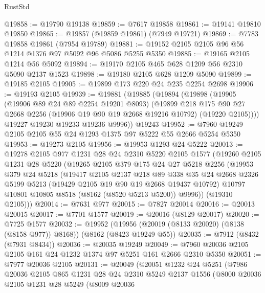 \begin{lexlean}{RustStd}
\begin{coremodule}
@19858 := @19790 @19138
@19859 := @7617 @19858
@19861 := @19141 @19810 @19850
@19865 := @19857 (@19859 @19861) (@7949 @19721)
@19869 := @7783 @19858 @19861 (@7954 @19789)
@19881 := @19152 @2105 @2105 @96 @56 @1214 @1376 @97 @5092 @96 @5086 @5255 @5350
@19885 := @19165 @2105 @1214 @56 @5092
@19894 := @19170 @2105 @465 @628 @1209 @56 @2310 @5090 @2137 @1523
@19898 := @19180 @2105 @628 @1209 @5090
@19899 := @19185 @2105
@19905 := @19899 @173 @220 @24 @235 @2254 @2698
@19906 := @19193 @2105
@19939 := @19881
    (@19885
      (@19894
        (@19898
          (@19905
            (@19906 @89 @24 @89 @2254 @19201 @8093)
            (@19899
              @218
              @175
              @90
              @27
              @2668
              @2256
              (@19906 @19 @90 @19 @2668 @19216 @10792)
              (@19220 @2105))))
        @19227
        @19230
        @19233
        @19236
        @9996))
    @19243
@19952 := @7960 @19249 @2105 @2105 @55 @24 @1293 @1375 @97 @5222 @55 @2666 @5254 @5350
@19953 := @19273 @2105
@19956 := @19953 @1293 @24 @5222
@20013 := @19278
    @2105
    @977
    @1231
    @28
    @24
    @2310
    @5220
    @2105
    @1577
    (@19260
      @2105
      @1231
      @28
      @5220
      (@19265
        @2105
        @379
        @175
        @24
        @27
        @5218
        @2256
        (@19953
          @379
          @24
          @5218
          (@19417
            @2105
            @2137
            @218
            @89
            @338
            @35
            @24
            @2668
            @2326
            @5199
            @5213
            (@19429 @2105 @19 @90 @19 @2668 @19437 @10792)
            @10797
            @10801
            @10805
            @8518
            (@8162 (@8520 @5213 @5200))
            @9996))
        (@19310 @2105)))
@20014 := @7631 @977
@20015 := @7827 @20014
@20016 := @20013 @20015
@20017 := @7701 @1577
@20019 := @20016 (@8129 @20017)
@20020 := @7725 @1577
@20032 := @19952
    (@19956 (@20019 (@8133 @20020) (@8138 (@8158 @977)) @8168))
    (@8162 (@8423 @19249 @55))
@20035 := @7912 (@8432 (@7931 @8434))
@20036 := @20035 @19249
@20049 := @7960 @20036 @2105 @2105 @161 @24 @1232 @1374 @97 @5251 @161 @2666 @2310 @5350
@20051 := @7977 @20036 @2105
@20131 := @20049
    (@20051
      @1232
      @24
      @5251
      (@7986
        @20036
        @2105
        @865
        @1231
        @28
        @24
        @2310
        @5249
        @2137
        @1556
        (@8000
          @20036
          @2105
          @1231
          @28
          @5249
          (@8009
            @20036

\end{coremodule}
\end{lexlean}
